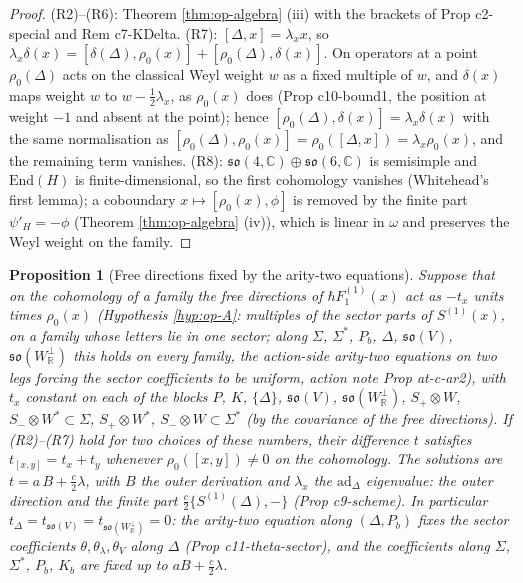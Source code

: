 \documentclass[11pt]{article}
\numberwithin{equation}{section}
\theoremstyle{plain}
\newtheorem{proposition}[theorem]{Proposition}
\theoremstyle{definition}
\begin{document}
\begin{proof}
(R2)--(R6): Theorem \ref{thm:op-algebra} (iii) with the brackets of Prop c2-special and Rem c7-KDelta. (R7): $[\Delta,x]=\lambda_xx$, so $\lambda_x\delta(x)=[\delta(\Delta),\rho_0(x)]+[\rho_0(\Delta),\delta(x)]$. On operators at a point $\rho_0(\Delta)$ acts on the classical Weyl weight $w$ as a fixed multiple of $w$, and $\delta(x)$ maps weight $w$ to $w-\tfrac12\lambda_x$, as $\rho_0(x)$ does (Prop c10-bound1, the position at weight $-1$ and absent at the point); hence $[\rho_0(\Delta),\delta(x)]=\lambda_x\delta(x)$ with the same normalisation as $[\rho_0(\Delta),\rho_0(x)]=\rho_0([\Delta,x])=\lambda_x\rho_0(x)$, and the remaining term vanishes. (R8): $\mathfrak{so}(4,\mathbb C)\oplus\mathfrak{so}(6,\mathbb C)$ is semisimple and $\mathrm{End}(H)$ is finite-dimensional, so the first cohomology vanishes (Whitehead's first lemma); a coboundary $x\mapsto[\rho_0(x),\phi]$ is removed by the finite part $\psi'_H=-\phi$ (Theorem \ref{thm:op-algebra} (iv)), which is linear in $\omega$ and preserves the Weyl weight on the family.
\end{proof}

\begin{proposition}[Free directions fixed by the arity-two equations]
\label{prop:op-tfix}
Suppose that on the cohomology of a family the free directions of $\hbar F_1^{(1)}(x)$ act as $-t_x$ units times $\rho_0(x)$ (Hypothesis \ref{hyp:op-A}: multiples of the sector parts of $S^{(1)}(x)$, on a family whose letters lie in one sector; along $\Sigma$, $\Sigma^*$, $P_b$, $\Delta$, $\mathfrak{so}(V)$, $\mathfrak{so}(W_{\mathbb R}^\perp)$ this holds on every family, the action-side arity-two equations on two legs forcing the sector coefficients to be uniform, action note Prop at-c-ar2), with $t_x$ constant on each of the blocks $P$, $K$, $\{\Delta\}$, $\mathfrak{so}(V)$, $\mathfrak{so}(W_{\mathbb R}^\perp)$, $S_+\otimes W$, $S_-\otimes W^*\subset\Sigma$, $S_+\otimes W^*$, $S_-\otimes W\subset\Sigma^*$ (by the covariance of the free directions). If (R2)--(R7) hold for two choices of these numbers, their difference $t$ satisfies $t_{[x,y]}=t_x+t_y$ whenever $\rho_0([x,y])\ne0$ on the cohomology. The solutions are $t=a\,B+\tfrac c2\lambda$, with $B$ the outer derivation and $\lambda_x$ the $\mathrm{ad}_\Delta$ eigenvalue: the outer direction and the finite part $\tfrac c2\{S^{(1)}(\Delta),-\}$ (Prop c9-scheme). In particular $t_\Delta=t_{\mathfrak{so}(V)}=t_{\mathfrak{so}(W_{\mathbb R}^\perp)}=0$: the arity-two equation along $(\Delta,P_b)$ fixes the sector coefficients $\theta,\theta_\lambda,\theta_V$ along $\Delta$ (Prop c11-theta-sector), and the coefficients along $\Sigma$, $\Sigma^*$, $P_b$, $K_b$ are fixed up to $aB+\tfrac c2\lambda$.
\end{proposition}
\end{document}
